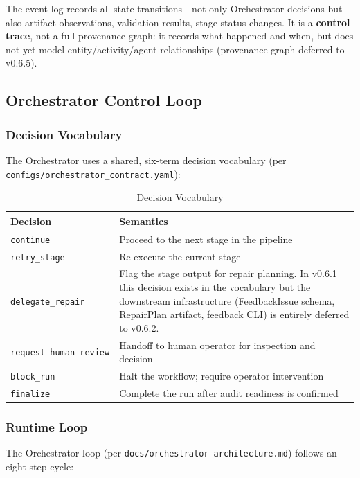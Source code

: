 \documentclass[11pt,a4paper]{article}
\begin{document}
The event log records all state transitions---not only Orchestrator decisions but also artifact observations, validation results, stage status changes. It is a \textbf{control trace}, not a full provenance graph: it records what happened and when, but does not yet model entity/activity/agent relationships (provenance graph deferred to v0.6.5).

\subsection{Orchestrator Control Loop}

\subsubsection{Decision Vocabulary}

The Orchestrator uses a shared, six-term decision vocabulary (per \texttt{configs/orchestrator\_contract.yaml}):

\begin{table}[ht]
\centering
\caption{Decision Vocabulary}
\label{tab:decisions}
\begin{tabular}{@{}lp{10cm}@{}}
\toprule
\textbf{Decision} & \textbf{Semantics} \\
\midrule
\texttt{continue} & Proceed to the next stage in the pipeline \\
\texttt{retry\_stage} & Re-execute the current stage \\
\texttt{delegate\_repair} & Flag the stage output for repair planning. In v0.6.1 this decision exists in the vocabulary but the downstream infrastructure (FeedbackIssue schema, RepairPlan artifact, feedback CLI) is entirely deferred to v0.6.2. \\
\texttt{request\_human\_review} & Handoff to human operator for inspection and decision \\
\texttt{block\_run} & Halt the workflow; require operator intervention \\
\texttt{finalize} & Complete the run after audit readiness is confirmed \\
\bottomrule
\end{tabular}
\end{table}

\subsubsection{Runtime Loop}

The Orchestrator loop (per \texttt{docs/orchestrator-architecture.md}) follows an eight-step cycle:
\end{document}

